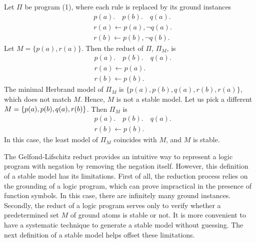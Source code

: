 Let $\Pi$ be program (1), where each rule is replaced by its ground instances 
\begin{align*}
    & p(a). \hspace{1em} p(b). \hspace{1em} q(a). \\
    & r(a) \leftarrow p(a), \neg q(a). \\ 
    & r(b) \leftarrow p(b), \neg q(b).
\end{align*}
Let $M = \{p(a),r(a)\}$. Then the reduct of $\Pi$, $\Pi _M$, is 
\begin{align*}
    & p(a). \hspace{1em} p(b). \hspace{1em} q(a). \\
    & r(a) \leftarrow p(a). \\ 
    & r(b) \leftarrow p(b).
\end{align*}
The minimal Herbrand model of $\Pi _M$ is $\{p(a),p(b),q(a),r(b),r(a)\}$, which does not 
match $M$. Hence, $M$ is not a stable model. Let us pick a different 
$M = \{p(a),p(b),q(a),\\r(b)\}$. Then $\Pi _M$ is
\begin{align*}
    & p(a). \hspace{1em} p(b). \hspace{1em} q(a). \\
    & r(b) \leftarrow p(b). 
\end{align*}
In this case, the least model of $\Pi _M$ coincides with $M$, and $M$ is stable.

The Gelfond-Lifschitz reduct provides an intuitive way to represent a logic 
program with negation by removing the negation itself. However, this definition 
of a stable model has its limitations. First of all, the reduction process relies 
on the grounding of a logic program, which can prove impractical in the presence of 
function symbols. In this case, there are infinitely many ground instances. 
Secondly, the reduct of a logic program serves only to verify whether a predetermined 
set $M$ of ground atoms is stable or not. It is more convenient to have a systematic 
technique to generate a stable model without guessing. The next definition of a stable 
model helps offset these limitations.

